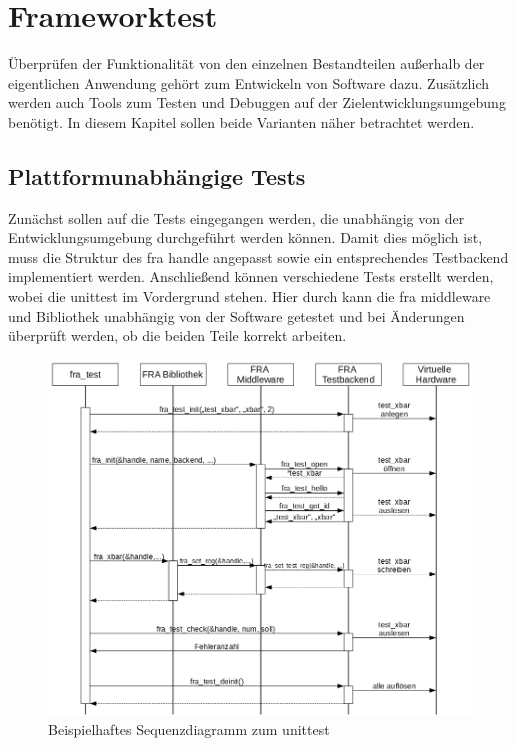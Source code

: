 \chapter{Frameworktest} \label{sec:test}
Überprüfen der Funktionalität von den einzelnen Bestandteilen außerhalb der eigentlichen Anwendung gehört zum Entwickeln von Software dazu. %
Zusätzlich werden auch Tools zum Testen und Debuggen auf der Zielentwicklungsumgebung benötigt. 
In diesem Kapitel sollen beide Varianten näher betrachtet werden.


\section{Plattformunabhängige Tests}
Zunächst sollen auf die Tests eingegangen werden, die unabhängig von der Entwicklungsumgebung durchgeführt werden können. 
Damit dies möglich ist, muss die Struktur des \ac{fra} \gls{handle} angepasst sowie ein entsprechendes Testbackend implementiert werden. Anschließend können verschiedene Tests erstellt werden, wobei die \gls{unittest} im Vordergrund stehen. Hier durch kann die \ac{fra} \gls{middleware} und Bibliothek unabhängig von der Software getestet und bei Änderungen überprüft werden, ob die beiden Teile korrekt arbeiten.

\begin{figure}[!hbtp]
	\centering
	\includegraphics[width = \linewidth]{pictures/2019-11-28-testbackend.png}
	\smallskip
	\caption{Beispielhaftes Sequenzdiagramm zum \gls{unittest}}
	\label{fig:testbackend}
\end{figure} 


